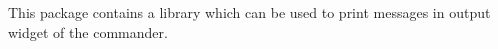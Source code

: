 This package contains a library which can be used to print messages in output widget of the commander. 
